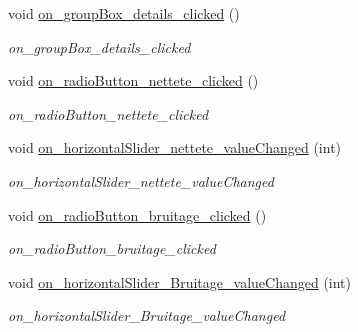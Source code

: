 \begin{DoxyCompactItemize}
\mbox{\label{classMainWindow_a38b3e512cfc669706a4238dc17aa8d1f}} 
void \hyperlink{classMainWindow_a38b3e512cfc669706a4238dc17aa8d1f}{on\+\_\+group\+Box\+\_\+details\+\_\+clicked} ()
\begin{DoxyCompactList}\small\item\em on\+\_\+group\+Box\+\_\+details\+\_\+clicked \end{DoxyCompactList}\item 
\mbox{\label{classMainWindow_a2f78b38c6a3ea4b7d0515b4f10dc2c0e}} 
void \hyperlink{classMainWindow_a2f78b38c6a3ea4b7d0515b4f10dc2c0e}{on\+\_\+radio\+Button\+\_\+nettete\+\_\+clicked} ()
\begin{DoxyCompactList}\small\item\em on\+\_\+radio\+Button\+\_\+nettete\+\_\+clicked \end{DoxyCompactList}\item 
\mbox{\label{classMainWindow_a3db26b38033cbb9eb6ff08f6aa50abcb}} 
void \hyperlink{classMainWindow_a3db26b38033cbb9eb6ff08f6aa50abcb}{on\+\_\+horizontal\+Slider\+\_\+nettete\+\_\+value\+Changed} (int)
\begin{DoxyCompactList}\small\item\em on\+\_\+horizontal\+Slider\+\_\+nettete\+\_\+value\+Changed \end{DoxyCompactList}\item 
\mbox{\label{classMainWindow_a9b6edbac08ead702bbfcd04d6b416831}} 
void \hyperlink{classMainWindow_a9b6edbac08ead702bbfcd04d6b416831}{on\+\_\+radio\+Button\+\_\+bruitage\+\_\+clicked} ()
\begin{DoxyCompactList}\small\item\em on\+\_\+radio\+Button\+\_\+bruitage\+\_\+clicked \end{DoxyCompactList}\item 
\mbox{\label{classMainWindow_a9b8d63047bfc67fb655e6a98a1231984}} 
void \hyperlink{classMainWindow_a9b8d63047bfc67fb655e6a98a1231984}{on\+\_\+horizontal\+Slider\+\_\+\+Bruitage\+\_\+value\+Changed} (int)
\begin{DoxyCompactList}\small\item\em on\+\_\+horizontal\+Slider\+\_\+\+Bruitage\+\_\+value\+Changed \end{DoxyCompactList}\item 

\end{DoxyCompactItemize}

